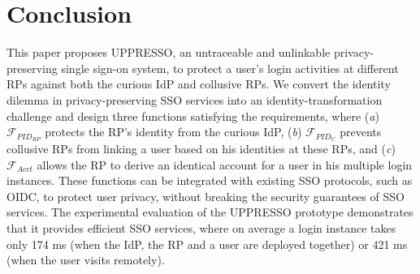 \section{Conclusion}
\label{sec:conclusion}
This paper proposes UPPRESSO, an untraceable and unlinkable privacy-preserving single sign-on system,
 to protect a user's login activities at different RPs against both the curious IdP and collusive RPs.
We convert the identity dilemma in privacy-preserving SSO services into an identity-transformation challenge
 and design three functions satisfying the requirements,
 where (\emph{a}) $\mathcal{F}_{PID_{RP}}$ protects the RP's identity from the curious IdP,
(\emph{b})  $\mathcal{F}_{PID_{U}}$ prevents collusive RPs from linking a user based on his identities at these RPs,
 and (\emph{c}) $\mathcal{F}_{Acct}$ allows the RP to derive an identical account for a user in his multiple login instances.
These functions can be integrated with existing SSO protocols,
    such as OIDC,
    to protect user privacy,
    without breaking the security guarantees of SSO services.
The experimental evaluation of the UPPRESSO prototype demonstrates
 that it provides efficient SSO services,
  where on average a login instance takes only 174 ms (when the IdP, the RP and a user are deployed together) or 421 ms (when the user visits remotely).
